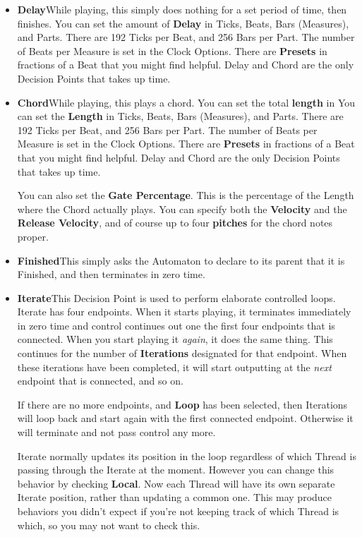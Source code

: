 \documentclass[twoside,10pt]{article}
\begin{document}
\begin{itemize}
\item{\bf Delay}\quad While playing, this simply does nothing for a set period of time, then finishes.  You can set the amount of {\bf Delay} in Ticks, Beats, Bars (Measures), and Parts.  There are 192 Ticks per Beat, and 256 Bars per Part.  The number of Beats per Measure is set in the Clock Options.  There are {\bf Presets} in fractions of a Beat that you might find helpful.  Delay and Chord are the only Decision Points that takes up time.

\item{\bf Chord}\quad While playing, this plays a chord.  You can set the total {\bf length} in  You can set the {\bf Length} in Ticks, Beats, Bars (Measures), and Parts.  There are 192 Ticks per Beat, and 256 Bars per Part.  The number of Beats per Measure is set in the Clock Options.  There are {\bf Presets} in fractions of a Beat that you might find helpful.  Delay and Chord are the only Decision Points that takes up time.

You can also set the {\bf Gate Percentage}.  This is the percentage of the Length where the Chord actually plays.   You can specify both the {\bf Velocity} and the {\bf Release Velocity}, and of course up to four {\bf pitches} for the chord notes proper.

\item{\bf Finished}\quad This simply asks the Automaton to declare to its parent that it is Finished, and then terminates in zero time.

\item{\bf Iterate}\quad This Decision Point is used to perform elaborate controlled loops.  Iterate  has four endpoints.  When it starts playing, it terminates immediately in zero time and control continues out one the first four endpoints that is connected. When you start playing it {\it again}, it does the same thing.  This continues for the number of {\bf Iterations} designated for that endpoint.  When these iterations have been completed, it will start outputting at the {\it next} endpoint that is connected, and so on. 

If there are no more endpoints, and {\bf Loop} has been selected, then Iterations will loop back and start again with the first connected endpoint.  Otherwise it will terminate and not pass control any more.

Iterate normally updates its position in the loop regardless of which Thread is passing through the Iterate at the moment.  However you can change this behavior by checking {\bf Local}.   Now each Thread will have its own separate Iterate position, rather than updating a common one.  This may produce behaviors you didn't expect if you're not keeping track of which Thread is which, so you may not want to check this.


\end{itemize}
\end{document}
